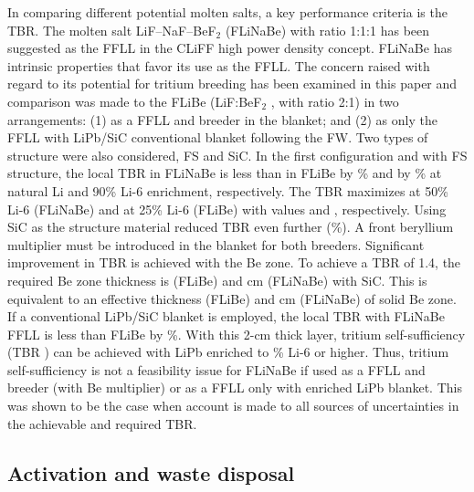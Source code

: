 In comparing different potential molten salts, a key performance criteria is
the \gls{TBR}.  The molten salt LiF--NaF--BeF$_2$ (FLiNaBe) with ratio 1:1:1 has
been suggested as the \gls{FFLL} in the \gls{CLiFF} high power density
concept. FLiNaBe has intrinsic properties that favor its use as the
\gls{FFLL}. The concern raised with regard to its potential for tritium
breeding has been examined in this paper and comparison was made to the FLiBe
(LiF:BeF$_2$ , with ratio 2:1) in two arrangements: (1) as a \gls{FFLL} and
breeder in the blanket; and (2) as only the \gls{FFLL} with LiPb/SiC
conventional blanket following the \gls{FW}. Two types of structure were also
considered, \gls{FS} and SiC.  In the first configuration and with \gls{FS}
structure, the local \gls{TBR} in FLiNaBe is less than in FLiBe by \% and by \% at natural Li and 90\% Li-6 enrichment,
respectively. The \gls{TBR} maximizes at 50\% Li-6 (FLiNaBe) and at 25\% Li-6
(FLiBe) with values  and , respectively. Using
SiC as the structure material reduced \gls{TBR} even further (\%). A front beryllium multiplier must be introduced in the blanket for both
breeders.  Significant improvement in \gls{TBR} is achieved with the Be
zone. To achieve a \gls{TBR} of 1.4, the required Be zone thickness is
 (FLiBe) and  cm (FLiNaBe) with SiC. This is
equivalent to an effective thickness  (FLiBe) and 
cm (FLiNaBe) of solid Be zone. If a conventional LiPb/SiC blanket is
employed, the local \gls{TBR} with FLiNaBe \gls{FFLL} is less than FLiBe by
\%. With this 2-cm thick layer, tritium self-sufficiency
(\gls{TBR} ) can be achieved with LiPb enriched to \% Li-6 or higher. Thus, tritium self-sufficiency is not a feasibility issue
for FLiNaBe if used as a \gls{FFLL} and breeder (with Be multiplier) or as a
\gls{FFLL} only with enriched LiPb blanket. This was shown to be the case when
account is made to all sources of uncertainties in the achievable and required
\gls{TBR}.

\subsection{Activation and waste disposal}

